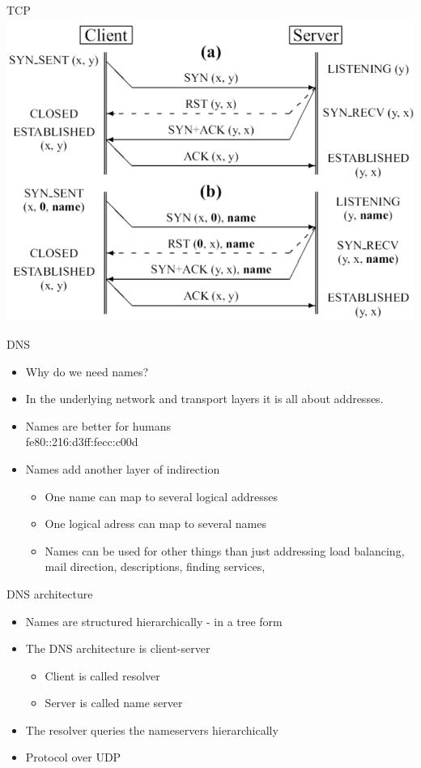 \documentclass{beamer}
\begin{document}
\begin{frame}{TCP}
    \includegraphics[width=0.7\linewidth]{synack}
\end{frame}

\begin{frame}{DNS}
\begin{itemize}
  \item Why do we need names?
  \item In the underlying network and transport layers it is all about
addresses.
\item Names are better for humans\\
fe80::216:d3ff:fecc:c00d
\item Names add another layer of indirection
\begin{itemize}
\item One name can map to several logical addresses
\item One logical adress can map to several names
\item Names can be used for other things than just addressing
  load balancing, mail direction, descriptions, finding services,
\end{itemize}
\end{itemize}
\end{frame}

\begin{frame}{DNS architecture}
\begin{itemize}
  \item Names are structured hierarchically - in a tree form
  \item The DNS architecture is client-server
\begin{itemize}
\item Client is called resolver
\item Server is called name server
\end{itemize}
\item The resolver queries the nameservers hierarchically
\item Protocol over UDP
\end{itemize}
\end{frame}
\end{document}
